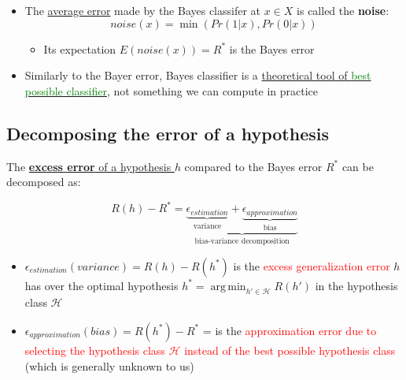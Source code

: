 \documentclass[12pt, a4paper]{article}
\DeclareMathOperator*{\argmin}{arg\,min} %
\begin{document}
\begin{itemize}
  \item The \uline{average error} made by the Bayes classifer at $x \in X$ is called the \textbf{noise}:
  $$
  noise(x) = \min(Pr(1|x),Pr(0|x))
  $$
  \begin{itemize}
    \item Its expectation $E(noise(x)) = R^*$ is the Bayes error
  \end{itemize}
  \item Similarly to the Bayer error, Bayes classifier is a \uline{theoretical tool of \textcolor{Green}{best possible classifier}}, not something we can compute in practice
\end{itemize}







\subsection{Decomposing the error of a hypothesis}\label{error-of-hypothesis}


The \uline{\textbf{excess error} of a hypothesis $h$} compared to the Bayes error $R^*$ can be decomposed as:

$$
R(h) - R^* = \underbrace{\underbrace{\epsilon_{estimation}}_\text{variance} + \underbrace{\epsilon_{approximation}}_\text{bias}}_\text{bias-variance decomposition}
$$
\begin{itemize}
  \item $\epsilon_{estimation} (variance) = R(h) - R(h^*)$ is the \textcolor{red}{excess generalization error} $h$ has over the optimal hypothesis $h^* = \argmin_{h' \in \mathcal{H}} R(h')$ in the hypothesis class $\mathcal{H}$
  \item $\epsilon_{approximation} (bias) = R(h^*) - R^*$ = is the \textcolor{red}{approximation error due to selecting the hypothesis class $\mathcal{H}$ instead of the best possible hypothesis class} (which is generally unknown to us)
\end{itemize}
\end{document}
